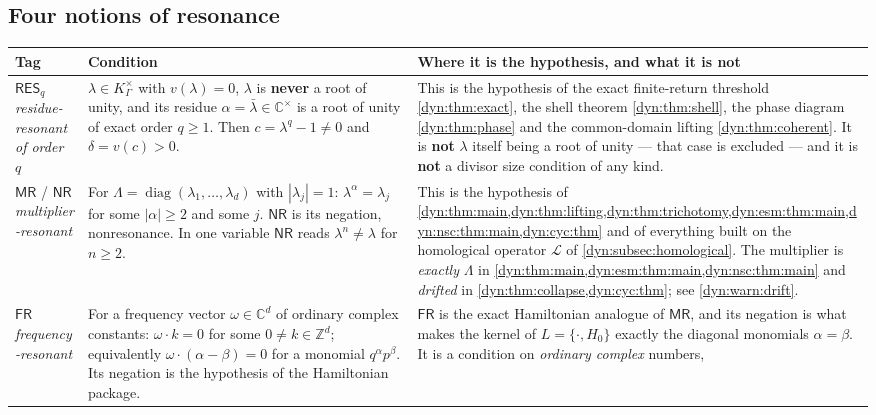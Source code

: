 \documentclass[11pt,letterpaper]{article}
\theoremstyle{definition}
\theoremstyle{remark}
\newcommand{\C}{\mathbb C}
\newcommand{\Z}{\mathbb Z}
\newcommand{\Li}{\mathcal L}
\newcommand{\resq}{\mathsf{RES}_q}
\newcommand{\mres}{\mathsf{MR}}
\newcommand{\nres}{\mathsf{NR}}
\newcommand{\fres}{\mathsf{FR}}
\numberwithin{equation}{section}
\begin{document}
\subsection{Four notions of resonance}
\label{dyn:subsec:resonance}

\begin{longtable}{@{}P{0.13\textwidth}P{0.40\textwidth}P{0.40\textwidth}@{}}
\toprule
Tag & Condition & Where it is the hypothesis, and what it is not\\
\midrule
\endhead
$\resq$\newline \emph{residue-resonant of order $q$}
&
$\lambda\in K_\Gamma^\times$ with $v(\lambda)=0$, $\lambda$ is
\textbf{never} a root of unity, and its residue
$\alpha=\bar\lambda\in\C^\times$ is a root of unity of exact order
$q\ge1$. Then $c=\lambda^{q}-1\ne0$ and $\delta=v(c)>0$.
&
This is the hypothesis of the exact finite-return threshold
\cref{dyn:thm:exact}, the shell theorem \cref{dyn:thm:shell}, the phase
diagram \cref{dyn:thm:phase} and the common-domain lifting
\cref{dyn:thm:coherent}. It is \textbf{not} $\lambda$ itself being a root
of unity --- that case is excluded --- and it is \textbf{not} a divisor
size condition of any kind.\\[4pt]
$\mres$ / $\nres$\newline \emph{multiplier-resonant}
&
For $\Lambda=\operatorname{diag}(\lambda_1,\dots,\lambda_d)$ with
$|\lambda_j|=1$: $\lambda^{\alpha}=\lambda_j$ for some $|\alpha|\ge2$ and
some $j$. $\nres$ is its negation, nonresonance. In one variable
$\nres$ reads $\lambda^{n}\ne\lambda$ for $n\ge2$.
&
This is the hypothesis of \cref{dyn:thm:main,dyn:thm:lifting,dyn:thm:trichotomy,dyn:esm:thm:main,dyn:nsc:thm:main,dyn:cyc:thm}
and of everything built on the homological operator $\Li$ of
\cref{dyn:subsec:homological}. The multiplier is \emph{exactly} $\Lambda$
in \cref{dyn:thm:main,dyn:esm:thm:main,dyn:nsc:thm:main} and \emph{drifted} in
\cref{dyn:thm:collapse,dyn:cyc:thm}; see \cref{dyn:warn:drift}.\\[4pt]
$\fres$\newline \emph{frequency-resonant}
&
For a frequency vector $\omega\in\C^{d}$ of ordinary complex constants:
$\omega\cdot k=0$ for some $0\ne k\in\Z^{d}$; equivalently
$\omega\cdot(\alpha-\beta)=0$ for a monomial $q^{\alpha}p^{\beta}$. Its
negation is the hypothesis of the Hamiltonian package.
&
$\fres$ is the exact Hamiltonian analogue of $\mres$, and its negation is
what makes the kernel of $L=\{\cdot,H_0\}$ exactly the diagonal monomials
$\alpha=\beta$. It is a condition on \emph{ordinary complex} numbers,

\end{longtable}
\end{document}
